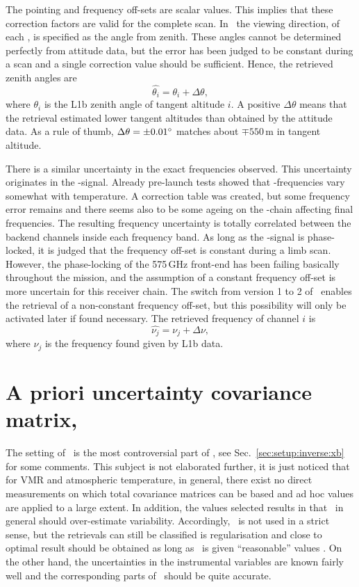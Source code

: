 The pointing and frequency off-sets are scalar values. This implies that these
correction factors are valid for the complete scan. In \ARTS\ the viewing
direction, of each \LOS, is specified as the angle from zenith. These angles
cannot be determined perfectly from attitude data, but the error has been
judged to be constant during a scan and a single correction value should be
sufficient. Hence, the retrieved zenith angles are
\begin{equation}
  \label{eq:retr:point}
  \hat{\theta_i} = \theta_i + \Delta\theta,  
\end{equation}
where $\theta_i$ is the L1b zenith angle of tangent altitude $i$. A positive 
$\Delta\theta$ means that the retrieval estimated lower tangent altitudes than
obtained by the attitude data. As a rule of thumb, $\Delta\theta=\pm0.01^\circ$
matches about $\mp550$\,m in tangent altitude.

There is a similar uncertainty in the exact frequencies observed. This
uncertainty originates in the \LO-signal. Already pre-launch tests showed that
\LO-frequencies vary somewhat with temperature. A correction table was created,
but some frequency error remains and there seems also to be some ageing on the
\LO-chain affecting final frequencies. The resulting frequency uncertainty is
totally correlated between the backend channels inside each frequency band. As
long as the \LO-signal is phase-locked, it is judged that the frequency off-set
is constant during a limb scan. However, the phase-locking of the
575\,GHz front-end has been failing basically throughout the mission, and the
assumption of a constant frequency off-set is more uncertain for this receiver
chain. The switch from version 1 to 2 of \ARTS\ enables the retrieval of a
non-constant frequency off-set, but this possibility will only be activated later
if found necessary. The retrieved frequency of channel $i$ is
\begin{equation}
  \label{eq:retr:freq}
  \hat{\nu_j} = \nu_j + \Delta\nu,  
\end{equation}
where $\nu_j$ is the frequency found given by L1b data.


\section{A priori uncertainty covariance matrix, }
\label{sec:Sa}
%
The setting of \ is the most controversial part of \OEM, see
Sec.~\ref{sec:setup:inverse:xb} for some comments. This subject is not
elaborated further, it is just noticed that for VMR and atmospheric
temperature, in general, there exist no direct measurements on which total
covariance matrices can be based and ad hoc values are applied to a large
extent. In addition, the values selected results in that \ in
general should over-estimate variability. Accordingly, \OEM\ is not used in a
strict sense, but the retrievals can still be classified is regularisation
\citep{ungermann2011tomographic} and close to optimal result should be obtained
as long as \ is given ``reasonable'' values
\citep{eriksson:analy:00}. On the other hand, the uncertainties in the
instrumental variables are known fairly well and the corresponding parts of
\ should be quite accurate.

